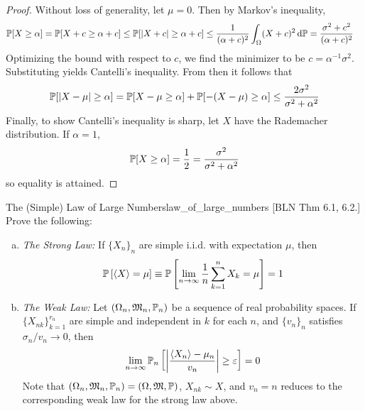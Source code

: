 \begin{proof}
    Without loss of generality, let \(\mu = 0\). Then by Markov's inequality,
    \begin{align*}
        \mathbb{P}[X \geq \alpha]
        &= \mathbb{P}[X + c \geq \alpha + c]
        \leq \mathbb{P}[|X + c| \geq \alpha + c]
        \leq \frac{1}{(\alpha + c)^2} \int_{\Omega} (X + c)^2 \, \mathrm{d}\mathbb{P}
        = \frac{\sigma^2 + c^2}{(\alpha + c)^2}
    \end{align*}
    Optimizing the bound with respect to \(c\), we find the minimizer to be \(c = \alpha^{-1} \sigma^2\). Substituting yields Cantelli's inequality. From then it follows that
    \[
        \mathbb{P}[|X - \mu| \geq \alpha]
        = \mathbb{P}[X - \mu \geq \alpha] + \mathbb{P}[-(X - \mu) \geq \alpha]
        \leq \frac{2\sigma^2}{\sigma^2 + \alpha^2}
    \]
    Finally, to show Cantelli's inequality is sharp, let \(X\) have the Rademacher distribution. If \(\alpha = 1\),
    \[
        \mathbb{P}[X \geq \alpha] = \frac{1}{2} = \frac{\sigma^2}{\sigma^2 + \alpha^2}
    \]
    so equality is attained.
\end{proof}


\begin{problem}{The (Simple) Law of Large Numbers}{law_of_large_numbers}
    [BLN Thm 6.1, 6.2.] Prove the following:
    \begin{enumerate}[(a)]
        \itemsep0em
        \item \textit{The Strong Law:} If \(\{X_n\}_n\) are simple i.i.d. with expectation \(\mu\), then
        \[
            \bb{P}\left[\ev{X} = \mu\right]
            \equiv \bb{P}\left[ \lim_{n \to \infty} \frac{1}{n} \sum_{k=1}^n X_k = \mu \right]
            = 1
        \]
        \item \textit{The Weak Law:} Let \((\Omega_n, \mathfrak{M}_n, \mathbb{P}_n)\) be a sequence of real probability spaces. If \(\{X_{nk}\}_{k=1}^{r_n}\) are simple and independent in \(k\) for each \(n\), and \(\{v_n\}_n\) satisfies \(\sigma_n / v_n \to 0\), then
        \[
            \lim_{n \to \infty} \bb{P}_n \left[ \left| \frac{\ev{X_n} - \mu_n}{v_n} \right| \geq \varepsilon \right] = 0
        \]
        Note that \((\Omega_n, \mathfrak{M}_n, \mathbb{P}_n) = (\Omega, \mathfrak{M}, \mathbb{P})\), \(X_{nk} \sim X\), and \(v_n = n\) reduces to the corresponding weak law for the strong law above. 
    \end{enumerate}
\end{problem}

